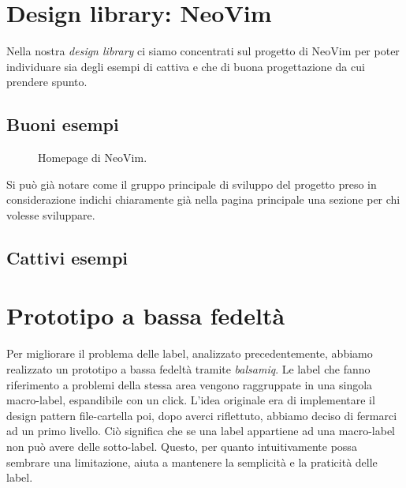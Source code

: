 \documentclass[12pt]{article} %
\begin{document}
\section{Design library: NeoVim}
Nella nostra \emph{design library} ci siamo concentrati sul progetto di NeoVim per poter individuare sia degli esempi di cattiva e che di buona progettazione da cui prendere spunto.\\
\subsection{Buoni esempi}

\begin{figure}[H] 
\caption{Homepage di NeoVim.}
\label{fig:buonesempio1}
\end{figure}

Si può già notare come il gruppo principale di sviluppo del progetto preso in considerazione indichi chiaramente già nella pagina principale una sezione per chi volesse sviluppare.

\subsection{Cattivi esempi}

\section{Prototipo a bassa fedeltà}
Per migliorare il problema delle label, analizzato precedentemente, abbiamo realizzato un prototipo a bassa fedeltà tramite \emph{balsamiq}.
Le label che fanno riferimento a problemi della stessa area vengono raggruppate in una singola macro-label, espandibile con un click. L'idea originale era di implementare il design pattern file-cartella poi, dopo averci riflettuto, abbiamo deciso di fermarci ad un primo livello. Ciò significa che se una label appartiene ad una macro-label non può avere delle sotto-label.
Questo, per quanto intuitivamente possa sembrare una limitazione, aiuta a mantenere la semplicità e la praticità delle label.

\end{document}

